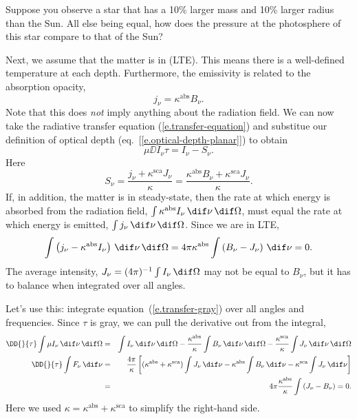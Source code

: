 \begin{exercisebox}
Suppose you observe a star that has a 10\% larger mass and 10\% larger radius than the Sun. All else being equal, how does the pressure at the photosphere of this star compare to that of the Sun?
\end{exercisebox}

Next, we assume that the matter is in  (LTE). This means there is a well-defined temperature at each depth. Furthermore, the emissivity is related to the absorption opacity,
\[
	j_{\nu} = \kappa^{\mathrm{abs}}B_{\nu}.
\]
Note that this does \emph{not} imply anything about the radiation field. We can now take the radiative transfer equation (\ref{e.transfer-equation}) and substitue our definition of optical depth (eq.~[\ref{e.optical-depth-planar}]) to obtain
\begin{equation}\label{e.transfer-gray}
	\mu\DD{I_{\nu}}{\tau} = I_{\nu} - S_{\nu}.
\end{equation}
Here
\[
	S_{\nu} = \frac{j_{\nu} + \kappa^{\mathrm{sca}} J_{\nu}}{\kappa}
	= \frac{\kappa^{\mathrm{abs}} B_{\nu} + \kappa^{\mathrm{sca}} J_{\nu}}{\kappa}.
\]
If, in addition, the matter is in steady-state, then the rate at which energy is absorbed from the radiation field, $\int\kappa^{\mathrm{abs}}I_{\nu}\,\dif\nu\,\dif\Omega$, must equal the rate at which energy is emitted, $\int j_{\nu}\,\dif\nu\,\dif\Omega$. Since we are in LTE,
\[
	\int \left(j_{\nu} - \kappa^{\mathrm{abs}}I_{\nu}\right)\,\dif\nu\,\dif\Omega
	= 4\pi\kappa^{\mathrm{abs}}\int\left(B_{\nu} - J_{\nu}\right)\,\dif\nu = 0.
\]
The average intensity, $J_{\nu} = (4\pi)^{-1}\int I_{\nu}\,\dif\Omega$ may not be equal to $B_{\nu}$, but it has to balance when integrated over all angles.

Let's use this: integrate equation~(\ref{e.transfer-gray}) over all angles and frequencies. Since $\tau$ is gray, we can pull the derivative out from the integral,
\begin{eqnarray*}
	\DD{}{\tau}\int \mu I_{\nu}\,\dif\nu\,\dif\Omega &=& \int I_{\nu}\,\dif\nu\,\dif\Omega - \frac{\kappa^{\mathrm{abs}}}{\kappa}\int B_{\nu}\,\dif\nu\,\dif\Omega - \frac{\kappa^{\mathrm{sca}}}{\kappa} \int J_{\nu}\,\dif\nu\,\dif\Omega\\
	\DD{}{\tau}\int F_{\nu}\,\dif\nu &=& \frac{4\pi}{\kappa}\left[
		(\kappa^{\mathrm{abs}}+\kappa^{\mathrm{sca}})\int J_{\nu}\,\dif\nu
		- \kappa^{\mathrm{abs}}\int B_{\nu}\,\dif\nu
		- \kappa^{\mathrm{sca}}\int J_{\nu}\,\dif\nu\right]\\
	&=& 4\pi\frac{\kappa^{\mathrm{abs}}}{\kappa}\int\left(J_{\nu}-B_{\nu}\right) = 0.
\end{eqnarray*}
Here we used $\kappa = \kappa^{\mathrm{abs}}+\kappa^{\mathrm{sca}}$ to simplify the right-hand side.

